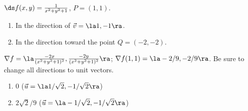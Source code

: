 {$\ds f(x,y) = \frac{1}{x^2+y^2+1}$, $P = (1,1)$.
\begin{enumerate}
	\item In the direction of $\vec v = \la 1,-1\ra$.
	\item In the direction toward the point $Q = (-2,-2)$.
\end{enumerate}
}
{$\nabla f = \la \frac{-2x}{(x^2+y^2+1)^2}, \frac{-2y}{(x^2+y^2+1)^2}\ra$; $\nabla f(1,1) = \la -2/9,-2/9\ra$. Be sure to change all directions to unit vectors.
\begin{enumerate}
	\item 0 ($\vec u = \la 1/\sqrt{2},-1/\sqrt{2}\ra$)
	\item	$2\sqrt{2}/9$ ($\vec u = \la -1/\sqrt{2},-1/\sqrt{2}\ra$)
\end{enumerate}
}
